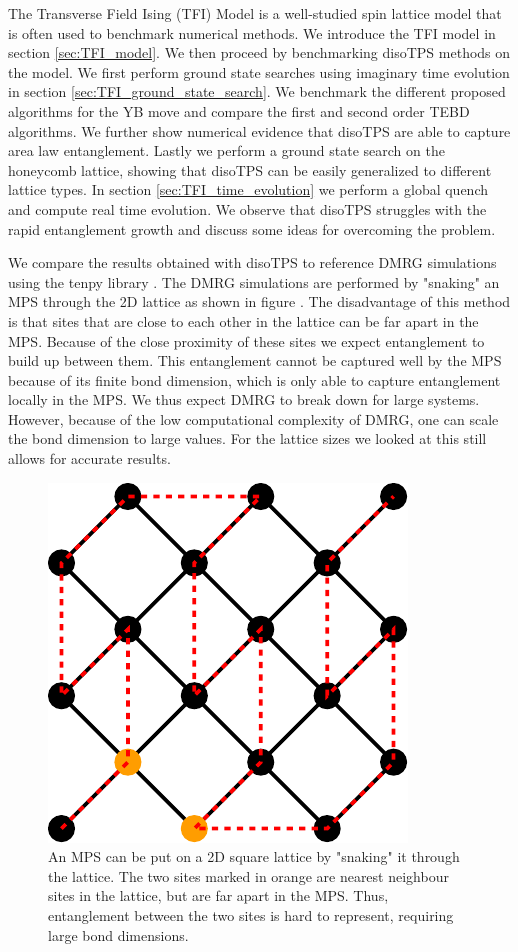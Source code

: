 The Transverse Field Ising (TFI) Model is a well-studied spin lattice model that is often used to benchmark numerical methods. We introduce the TFI model in section \ref{sec:TFI_model}. We then proceed by benchmarking disoTPS methods on the model. We first perform ground state searches using imaginary time evolution in section \ref{sec:TFI_ground_state_search}. We benchmark the different proposed algorithms for the YB move and compare the first and second order TEBD algorithms. We further show numerical evidence that disoTPS are able to capture area law entanglement. Lastly we perform a ground state search on the honeycomb lattice, showing that disoTPS can be easily generalized to different lattice types. In section \ref{sec:TFI_time_evolution} we perform a global quench and compute real time evolution. We observe that disoTPS struggles with the rapid entanglement growth and discuss some ideas for overcoming the problem. \par
We compare the results obtained with disoTPS to reference DMRG simulations using the tenpy library \cite{cite:tenpy}. The DMRG simulations are performed by "snaking" an MPS through the 2D lattice as shown in figure . The disadvantage of this method is that sites that are close to each other in the lattice can be far apart in the MPS. Because of the close proximity of these sites we expect entanglement to build up between them. This entanglement cannot be captured well by the MPS because of its finite bond dimension, which is only able to capture entanglement locally in the MPS. We thus expect DMRG to break down for large systems. However, because of the low computational complexity of DMRG, one can scale the bond dimension to large values. For the lattice sizes we looked at this still allows for accurate results.
\begin{figure}
	\centering
	\includegraphics[scale=1]{figures/tikz/TFI/dmrg_snaking/dmrg_snaking.pdf}
	\caption{An MPS can be put on a 2D square lattice by "snaking" it through the lattice. The two sites marked in orange are nearest neighbour sites in the lattice, but are far apart in the MPS. Thus, entanglement between the two sites is hard to represent, requiring large bond dimensions.}
	\label{fig:tenpy_snaking}
\end{figure}


